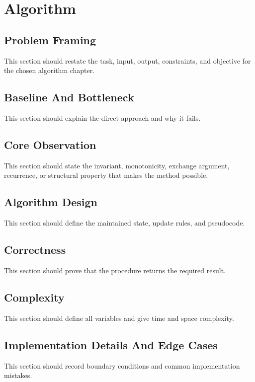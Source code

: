 \section{Algorithm}

\subsection{Problem Framing}
This section should restate the task, input, output, constraints, and objective for the chosen algorithm chapter.

\subsection{Baseline And Bottleneck}
This section should explain the direct approach and why it fails.

\subsection{Core Observation}
This section should state the invariant, monotonicity, exchange argument, recurrence, or structural property that makes the method possible.

\subsection{Algorithm Design}
This section should define the maintained state, update rules, and pseudocode.

\subsection{Correctness}
This section should prove that the procedure returns the required result.

\subsection{Complexity}
This section should define all variables and give time and space complexity.

\subsection{Implementation Details And Edge Cases}
This section should record boundary conditions and common implementation mistakes.
